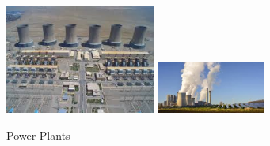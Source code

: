 \documentclass[11 pt]{article}
\begin{document}
\begin{figure}[h]
	\includegraphics[width=140pt]{Gallery/Six.jpg}
	\includegraphics[width=100pt]{Gallery/Seven.jpg}
\caption{Power Plants}
\end{figure}

\pagebreak
\end{document}
